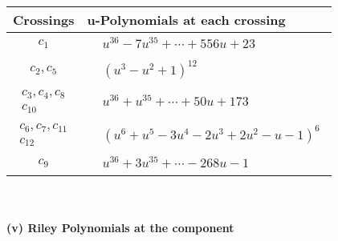 \documentclass[1p]{elsarticle_modified}
\theoremstyle{definition}
\begin{document}
\begin{tabular}{m{50pt}|m{274pt}}
Crossings & \hspace{64pt}u-Polynomials at each crossing \\
\hline $$\begin{aligned}c_{1}\end{aligned}$$&$\begin{aligned}
&u^{36}-7 u^{35}+\cdots+556 u+23
\end{aligned}$\\
\hline $$\begin{aligned}c_{2},c_{5}\end{aligned}$$&$\begin{aligned}
&(u^3- u^2+1)^{12}
\end{aligned}$\\
\hline $$\begin{aligned}c_{3},c_{4},c_{8}\\c_{10}\end{aligned}$$&$\begin{aligned}
&u^{36}+u^{35}+\cdots+50 u+173
\end{aligned}$\\
\hline $$\begin{aligned}c_{6},c_{7},c_{11}\\c_{12}\end{aligned}$$&$\begin{aligned}
&(u^6+u^5-3 u^4-2 u^3+2 u^2- u-1)^6
\end{aligned}$\\
\hline $$\begin{aligned}c_{9}\end{aligned}$$&$\begin{aligned}
&u^{36}+3 u^{35}+\cdots-268 u-1
\end{aligned}$\\
\hline
\end{tabular}\\~\\
\newpage\renewcommand{\arraystretch}{1}
\flushleft \textbf{(v) Riley Polynomials at the component}\newline \\
\end{document}
